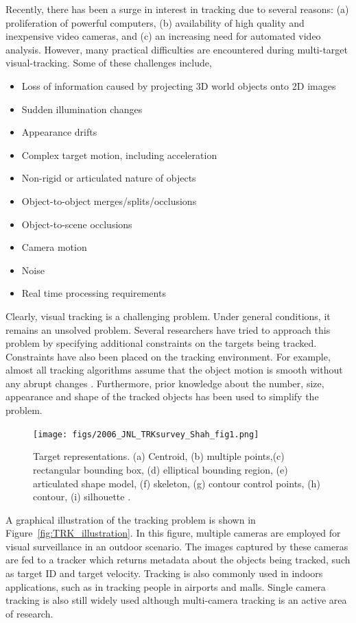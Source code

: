 Recently, there has been a surge in interest in tracking due to several reasons: (a) proliferation of powerful computers, (b) availability of high quality and inexpensive video cameras, and (c) an increasing need for automated video analysis.  However, many practical difficulties are encountered during multi-target visual-tracking.  Some of these challenges include, 

\begin{itemize}
\item Loss of information caused by projecting 3D world objects onto 2D images
\item Sudden illumination changes
\item Appearance drifts
\item Complex target motion, including acceleration
\item Non-rigid or articulated nature of objects
\item Object-to-object merges/splits/occlusions
\item Object-to-scene occlusions
\item Camera motion
\item Noise
\item Real time processing requirements
\end{itemize} 

Clearly, visual tracking is a challenging problem.  Under general conditions, it remains an unsolved problem.  Several researchers have tried to approach this problem by specifying additional constraints on the targets being tracked.  Constraints have also been placed on the tracking environment.  For example, almost all tracking algorithms assume that the object motion is smooth without any abrupt changes \cite{2006_JNL_SURVEYtrk_Yilmaz}.  Furthermore, prior knowledge about the number, size, appearance and shape of the tracked objects has been used to simplify the problem.  

\begin{figure}[t]
	\center
	\texttt{[image: figs/2006\_JNL\_TRKsurvey\_Shah\_fig1.png]}
	\caption{Target representations.  (a) Centroid, (b) multiple points,(c) rectangular bounding box, (d) elliptical bounding region, (e) articulated shape model, (f) skeleton, (g) contour control points, (h) contour, (i) silhouette \cite{2006_JNL_SURVEYtrk_Yilmaz}.}
	\label{fig:TRK_objectRepresentations}
\end{figure}

A graphical illustration of the tracking problem is shown in Figure~\ref{fig:TRK_illustration}.  In this figure, multiple cameras are employed for visual surveillance in an outdoor scenario.  The images captured by these cameras are fed to a tracker which returns metadata about the objects being tracked, such as target ID and target velocity.  Tracking is also commonly used in indoors applications, such as in tracking people in airports and malls.  Single camera tracking is also still widely used although multi-camera tracking is an active area of research.

